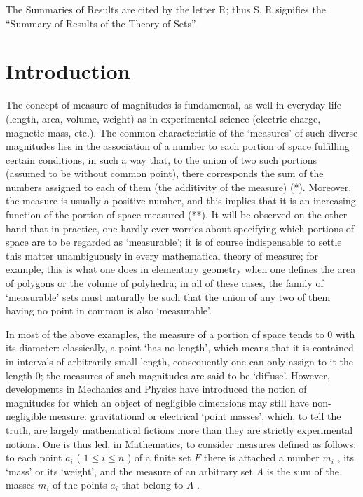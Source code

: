The Summaries of Results are cited by the letter R; thus S, R signifies the ``Summary of Results of the Theory of Sets''.

\chapter*{Introduction}
{}

The concept of measure of magnitudes is fundamental, as well in everyday life (length, area, volume, weight) as in experimental science (electric charge, magnetic mass, etc.). The common characteristic of the `measures' of such diverse magnitudes lies in the association of a number to each portion of space fulfilling certain conditions, in such a way that, to the union of two such portions (assumed to be without common point), there corresponds the sum of the numbers assigned to each of them (the additivity of the measure) (*). Moreover, the measure is usually a positive number, and this implies that it is an increasing function of the portion of space measured (**). It will be observed on the other hand that in practice, one hardly ever worries about specifying which portions of space are to be regarded as `measurable'; it is of course indispensable to settle this matter unambiguously in every mathematical theory of measure; for example, this is what one does in elementary geometry when one defines the area of polygons or the volume of polyhedra; in all of these cases, the family of `measurable' sets must naturally be such that the union of any two of them having no point in common is also `measurable'.

In most of the above examples, the measure of a portion of space tends to 0 with its diameter: classically, a point `has no length', which means that it is contained in intervals of arbitrarily small length, consequently one can only assign to it the length 0; the measures of such magnitudes are said to be `diffuse'. However, developments in Mechanics and Physics have introduced the notion of magnitudes for which an object of negligible dimensions may still have non-negligible measure: gravitational or electrical `point masses', which, to tell the truth, are largely mathematical fictions more than they are strictly experimental notions. One is thus led, in Mathematics, to consider measures defined as follows: to each point \(a_i\) ( \(1 \leqslant i \leqslant n\) ) of a finite set \(F\) there is attached a number \(m_i\) , its `mass' or its `weight', and the measure of an arbitrary set \(A\) is the sum of the masses \(m_i\) of the points \(a_i\) that belong to \(A\) .

